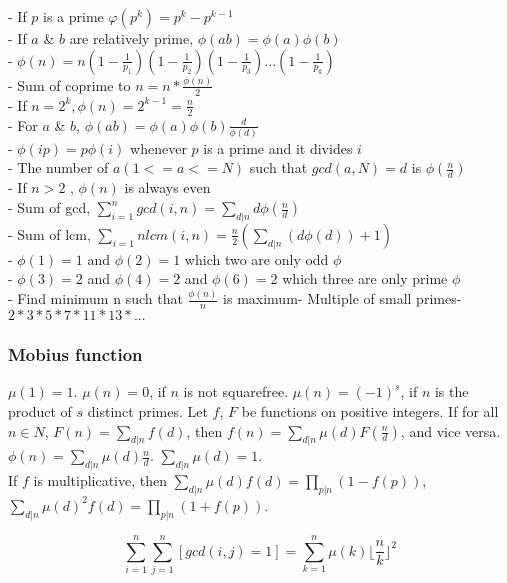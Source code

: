 - If \( p \) is a prime \( φ(p^k) = p^k - p^{k-1} \) \\
- If \( a \) & \( b \) are relatively prime, \( \phi(ab) = \phi(a)\phi(b) \) \\
- \( \phi(n) = n(1-\frac{1}{p_1})(1-\frac{1}{p_2})(1-\frac{1}{p_3})...(1-\frac{1}{p_k}) \) \\
- Sum of coprime to \( n = n * \frac{\phi(n)}{2} \) \\
- If \( n = 2^k, \phi(n) = 2^{k - 1} = \frac{n}{2} \) \\
- For \( a \) & \( b \), \( \phi(ab) = \phi(a)\phi(b)\frac{d}{\phi(d)} \) \\
- \( \phi (ip) = p \phi(i) \) whenever \( p \) is a prime and it divides \( i \) \\
- The number of \( a (1<= a <=N) \) such that \( gcd(a, N)=d \) is \( \phi(\frac{n}{d}) \) \\
- If \( n > 2 \) , \( \phi(n) \) is always even \\
- Sum of gcd, \( \sum_{i=1}^n gcd(i, n) = \sum_{d|n} d \phi(\frac{n}{d}) \) \\
- Sum of lcm, \( \sum_{i=1}{n}lcm(i, n) = \frac{n}{2}(\sum_{d|n}(d \phi(d))+1) \) \\
- \( \phi(1) = 1 \) and \( \phi(2) = 1 \) which two are only odd \( \phi \) \\
- \( \phi(3) = 2 \) and \( \phi(4) = 2 \) and \( \phi(6) = 2 \) which three are only prime \( \phi \) \\
- Find minimum n such that $ \frac{\phi(n)} {n} $ is  maximum- Multiple of small primes- $ 2 * 3 * 5 * 7 * 11 * 13 * ... $ \\

\subsubsection{Mobius function}
$\mu(1) = 1$. $\mu(n) = 0$, if $n$ is not squarefree.
$\mu(n) = (-1)^s$, if $n$ is the product of $s$ distinct primes.
Let $f$, $F$ be functions on positive integers.
If for all $n \in N$, $F(n)=\sum_{d|n} f(d)$, then $f(n) = \sum_{d|n} \mu(d) F(\frac{n}{d})$,
and vice versa. \quad
$\phi(n) = \sum_{d|n} \mu(d) \frac{n}{d}$.
\quad $\sum_{d|n} \mu(d) = 1$. \\
If $f$ is multiplicative, then $\sum_{d|n} \mu(d) f(d) = \prod_{p|n}(1-f(p))$,
$\sum_{d|n} \mu(d)^2 f(d) = \prod_{p|n} (1+f(p))$.

\[ \sum_{i = 1}^n \sum_{j = 1}^n [gcd(i, j) = 1] = \sum_{k = 1}^n \mu(k) \lfloor \frac{n}{k} \rfloor^2 \]

